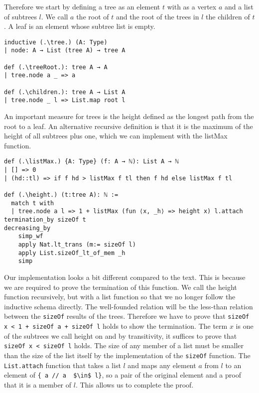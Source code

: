 Therefore we start by defining a tree as an element $t$ with as a vertex $a$ and a list of subtrees $l$. We call $a$ the root of $t$ and the root of the trees in $l$ the children of $t$. A leaf is an element whose subtree list is empty.

\begin{lstlisting}
inductive (.\tree.) (A: Type)
| node: A → List (tree A) → tree A

def (.\treeRoot.): tree A → A
| tree.node a _ => a

def (.\children.): tree A → List A
| tree.node _ l => List.map root l
\end{lstlisting}

An important measure for trees is the height defined as the longest path from the root to a leaf.  An alternative recursive definition is that it is the maximum of the height of all subtrees plus one, which we can implement with the listMax function.

\begin{lstlisting}
def (.\listMax.) {A: Type} (f: A → ℕ): List A → ℕ
| [] => 0
| (hd::tl) => if f hd > listMax f tl then f hd else listMax f tl

def (.\height.) (t:tree A): ℕ :=
  match t with
  | tree.node a l => 1 + listMax (fun ⟨x, _h⟩ => height x) l.attach
termination_by sizeOf t
decreasing_by
    simp_wf
    apply Nat.lt_trans (m:= sizeOf l)
    apply List.sizeOf_lt_of_mem _h
    simp
\end{lstlisting}

Our implementation looks a bit different compared to the text. This is because we are required to prove the termination of this function. We call the height function recursively, but with a list function so that we no longer follow the inductive schema directly. The well-founded relation will be the less-than relation between the \lstinline|sizeOf| results of the trees. Therefore we have to prove that \lstinline|sizeOf x < 1 + sizeOf a + sizeOf l| holds to show the termination. The term $x$ is one of the subtrees we call height on and by transitivity, it suffices to prove that \lstinline|sizeOf x < sizeOf l| holds. The size of any member of a list must be smaller than the size of the list itself by the implementation of the \lstinline|sizeOf| function. The \lstinline|List.attach| function that takes a list $l$ and maps any element $a$ from $l$ to an element of \lstinline|{ a // a  $\in$ l}|, so a pair of the original element and a proof that it is a member of $l$. This allows us to complete the proof.

